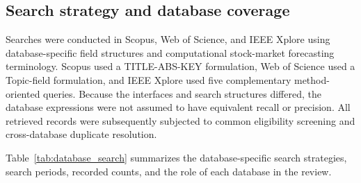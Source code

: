 \documentclass[pdflatex,sn-mathphys-num]{sn-jnl}%
\theoremstyle{thmstyleone}%
\theoremstyle{thmstyletwo}%
\theoremstyle{thmstylethree}%
\begin{document}
\subsection{Search strategy and database coverage}
\label{sec:search-strategy}

Searches were conducted in Scopus, Web of Science, and IEEE Xplore using
database-specific field structures and computational stock-market forecasting
terminology. Scopus used a TITLE-ABS-KEY formulation, Web of Science used a
Topic-field formulation, and IEEE Xplore used five complementary
method-oriented queries. Because the interfaces and search structures differed,
the database expressions were not assumed to have equivalent recall or
precision. All retrieved records were subsequently subjected to common
eligibility screening and cross-database duplicate resolution.

Table~\ref{tab:database_search} summarizes the database-specific
search strategies, search periods, recorded counts, and the role
of each database in the review.
\end{document}
